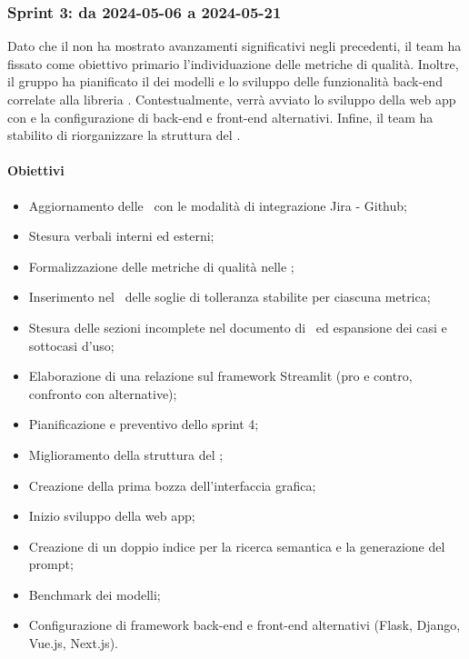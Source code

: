 \subsubsection{Sprint 3: da 2024-05-06 a 2024-05-21}
\par Dato che il \PdQ non ha mostrato avanzamenti significativi negli  precedenti, il team ha fissato come obiettivo primario l’individuazione delle metriche di qualità. Inoltre, il gruppo ha pianificato il  dei modelli e lo sviluppo delle funzionalità back-end correlate alla libreria . Contestualmente, verrà avviato lo sviluppo della web app con  e la configurazione di  back-end e front-end alternativi. Infine, il team ha stabilito di riorganizzare la struttura del \PdP.

\paragraph{Obiettivi}
\begin{itemize}
  \item Aggiornamento delle \NdP\ con le modalità di integrazione Jira - Github;
  \item Stesura verbali interni ed esterni;
  \item Formalizzazione delle metriche di qualità nelle \NdP;
  \item Inserimento nel \PdQ\ delle soglie di tolleranza stabilite per ciascuna metrica;
  \item Stesura delle sezioni incomplete nel documento di \AdR\ ed espansione dei casi e sottocasi d'uso;
  \item Elaborazione di una relazione sul framework Streamlit (pro e contro, confronto con alternative);
  \item Pianificazione e preventivo dello sprint 4;
  \item Miglioramento della struttura del \PdP;
  \item Creazione della prima bozza dell'interfaccia grafica;
  \item Inizio sviluppo della web app;
  \item Creazione di un doppio indice per la ricerca semantica e la generazione del prompt;
  \item Benchmark dei modelli;
  \item Configurazione di framework back-end e front-end alternativi (Flask, Django, Vue.js, Next.js).
\end{itemize}

\vspace{0.5\baselineskip}
\par [Inserire Gantt]